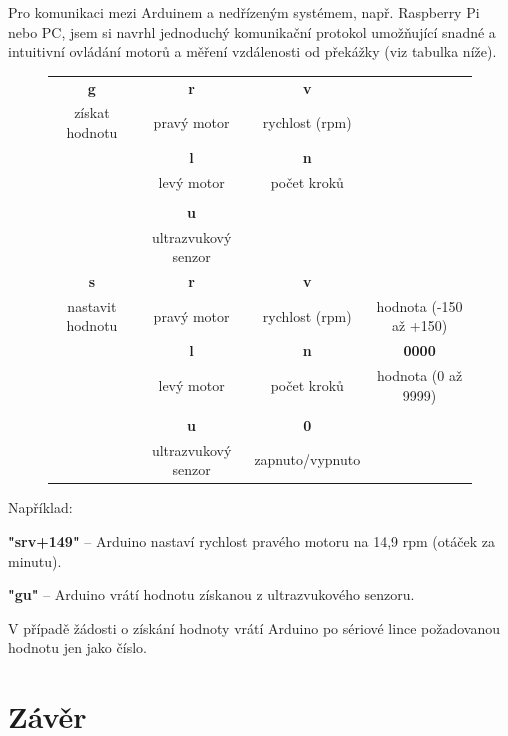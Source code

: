 \documentclass[12pt]{article}
\begin{document}
\begin{spacing}{1.5}
	Pro komunikaci mezi Arduinem a nedřízeným systémem, např. Raspberry Pi nebo PC, jsem si navrhl jednoduchý komunikační protokol umožňující snadné a intuitivní ovládání motorů a měření vzdálenosti od překážky (viz tabulka níže).
	
	\begin{figure}[H]
		\begin{spacing}{1}
			\begin{tabular}{|c|c|c|c|}
				\hline
				\textbf{g}			&	\textbf{r}		&	\textbf{v}		& \\
				získat hodnotu		&	pravý motor		&	rychlost (rpm)	& \\
									&	\textbf{l}		&	\textbf{n}		& \\
									&	levý motor		&	počet kroků		& \\
				&&&\\
									&	\textbf{u}		&					& \\
									&	ultrazvukový senzor &				& \\
				\hline
				\textbf{s}			&	\textbf{r}		&	\textbf{v}		& \textbf{\textpm000}\\
				nastavit hodnotu	&	pravý motor		&	rychlost (rpm)	& hodnota (-150 až +150)\\
									&	\textbf{l}		&	\textbf{n}		& \textbf{0000}\\
									&	levý motor		&	počet kroků		& hodnota (0 až 9999)\\
				&&&\\
									&	\textbf{u}		&	\textbf{0}		& \\
									&	ultrazvukový senzor & zapnuto/vypnuto & \\
				\hline
			\end{tabular}
		\end{spacing}
	\end{figure}
	
	Například:\par
	\textbf{"srv+149"} -- Arduino nastaví rychlost pravého motoru na 14,9 rpm (otáček za minutu).\par
	\textbf{"gu"} -- Arduino vrátí hodnotu získanou z ultrazvukového senzoru.
				
	
	V případě žádosti o získání hodnoty vrátí Arduino po sériové lince požadovanou hodnotu jen jako číslo.
	
	\newpage
	\section{Závěr}
	\paragraph{} 
	

\end{spacing}
\end{document}
